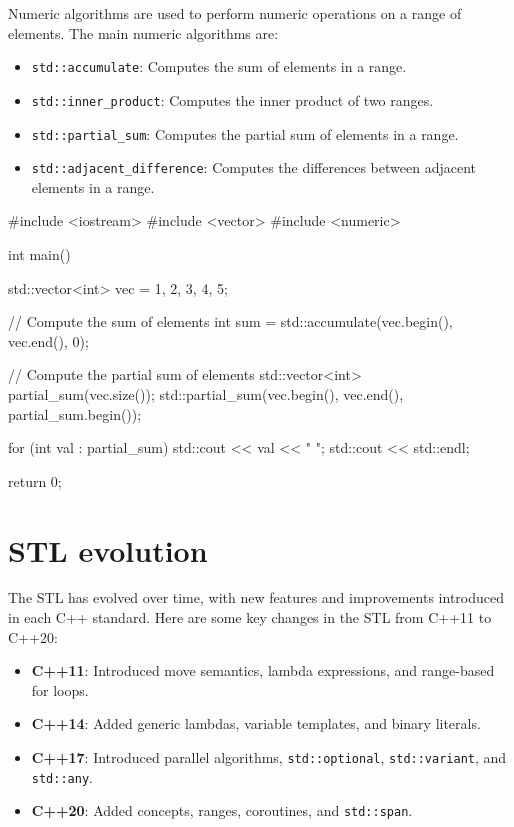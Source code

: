 Numeric algorithms are used to perform numeric operations on a range of elements. The main numeric algorithms are:

\begin{itemize}
    \item \texttt{std::accumulate}: Computes the sum of elements in a range.
    \item \texttt{std::inner\_product}: Computes the inner product of two ranges.
    \item \texttt{std::partial\_sum}: Computes the partial sum of elements in a range.
    \item \texttt{std::adjacent\_difference}: Computes the differences between adjacent elements in a range.
\end{itemize}

\begin{exampleblock}
\begin{codeblock}[language=C++]
#include <iostream>
#include <vector>
#include <numeric>

int main() {
    std::vector<int> vec = {1, 2, 3, 4, 5};

    // Compute the sum of elements
    int sum = std::accumulate(vec.begin(), vec.end(), 0);

    // Compute the partial sum of elements
    std::vector<int> partial_sum(vec.size());
    std::partial_sum(vec.begin(), vec.end(), partial_sum.begin());

    for (int val : partial_sum) {
        std::cout << val << " ";
    }
    std::cout << std::endl;

    return 0;
}
\end{codeblock}
\end{exampleblock}




\section{STL evolution}

The STL has evolved over time, with new features and improvements introduced in each C++ standard. Here are some key changes in the STL from C++11 to C++20:

\begin{itemize}
    \item \textbf{C++11}: Introduced move semantics, lambda expressions, and range-based for loops.
    \item \textbf{C++14}: Added generic lambdas, variable templates, and binary literals.
    \item \textbf{C++17}: Introduced parallel algorithms, \texttt{std::optional}, \texttt{std::variant}, and \texttt{std::any}.
    \item \textbf{C++20}: Added concepts, ranges, coroutines, and \texttt{std::span}.
\end{itemize}

